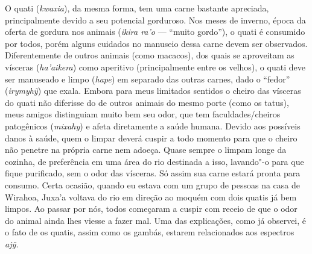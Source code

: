 O quati (\emph{kwaxia}), da mesma forma, tem uma carne bastante
apreciada, principalmente devido a seu potencial gorduroso. Nos meses de
inverno, época da oferta de gordura nos animais (\emph{ikira ra'o} ---
``muito gordo''), o quati é consumido por todos, porém alguns cuidados no
manuseio dessa carne devem ser observados. Diferentemente de outros
animais (como macacos), dos quais se aproveitam as vísceras
(\emph{ha'aikera}) como aperitivo (principalmente entre os velhos), o
quati deve ser manuseado e limpo (\emph{hape}) em separado das outras
carnes, dado o ``fedor'' (\emph{irymyhỹ}) que exala. Embora para meus
limitados sentidos o cheiro das vísceras do quati não diferisse do de
outros animais do mesmo porte (como os tatus), meus amigos distinguiam
muito bem seu odor, que tem faculdades/cheiros patogênicos
(\emph{mixahy}) e afeta diretamente a saúde humana. Devido aos possíveis
danos à saúde, quem o limpar deverá cuspir a todo momento para que o
cheiro não penetre na própria carne nem adoeça. Quase sempre o limpam
longe da cozinha, de preferência em uma área do rio destinada a isso,
lavando"-o para que fique purificado, sem o odor das vísceras. Só assim
sua carne estará pronta para consumo. Certa ocasião, quando eu estava
com um grupo de pessoas na casa de Wirahoa, Juxa'a voltava do rio em
direção ao moquém com dois quatis já bem limpos. Ao passar por nós,
todos começaram a cuspir com receio de que o odor do animal ainda lhes
viesse a fazer mal. Uma das explicações, como já observei, é o fato de
os quatis, assim como os gambás, estarem relacionados aos espectros
\emph{ajỹ.}

